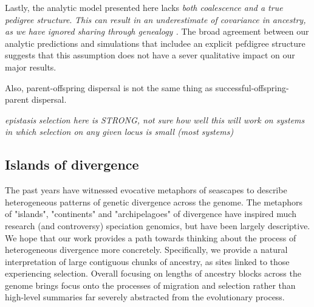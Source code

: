 \documentclass[12pt]{article}
\newcommand{\alisa}[1]{{\em \color{red} #1}}
\newcommand{\yb}[1]{{\em \color{magenta} #1}}
\begin{document}
Lastly, the analytic model presented here lacks \yb{both coalescence and a true pedigree structure}. \alisa{This can result in an underestimate of covariance in ancestry, as we have ignored sharing through genealogy \cite{Liang2014}.} 
The broad agreement between our analytic predictions and simulations that includee an explicit pefdigree structure suggests that this assumption does not have a sever qualitative impact on our major results. 



Also, parent-offspring dispersal is not the same thing as successful-offspring-parent dispersal.


\alisa{epistasis}
\alisa{selection here is STRONG, not sure how well this will work on systems in which selection on any given locus is small (most systems)}


\subsection{Islands of divergence}  
The past years have witnessed evocative metaphors of seascapes to describe heterogeneous patterns of genetic divergence across the genome.  
The metaphors of "islands", "continents" and "archipelagoes" of divergence have inspired much research (and controversy) speciation genomics, but have been largely descriptive.  
We hope that our work provides a path towards thinking about the process of heterogeneous divergence more concretely. %
Specifically, we provide a natural interpretation of large contiguous chunks of ancestry, as sites linked to those experiencing selection.   
Overall focusing on lengths of ancestry blocks across the genome brings focus onto the processes of migration and selection rather than high-level summaries far severely abstracted from the evolutionary process. 
\end{document}
